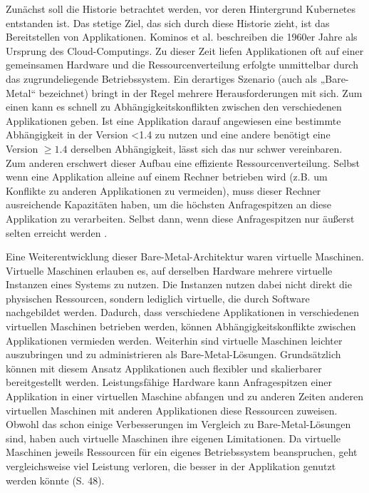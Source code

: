 \documentclass[11pt,a4paper]{article}
\begin{document}
Zunächst soll die Historie betrachtet werden, vor deren Hintergrund Kubernetes entstanden ist.
Das stetige Ziel, das sich durch diese Historie zieht, ist das Bereitstellen von Applikationen.
Kominos et al. \cite{7899247} beschreiben die 1960er Jahre als Ursprung des Cloud-Computings.
Zu dieser Zeit liefen Applikationen oft auf einer gemeinsamen Hardware und die Ressourcenverteilung erfolgte unmittelbar durch das zugrundeliegende Betriebssystem.
Ein derartiges Szenario (auch als „Bare-Metal“ bezeichnet) bringt in der Regel mehrere Herausforderungen mit sich.
Zum einen kann es schnell zu Abhängigkeitskonflikten zwischen den verschiedenen Applikationen geben.
Ist eine Applikation darauf angewiesen eine bestimmte Abhängigkeit in der Version <1.4 zu nutzen und eine andere
benötigt eine Version \(\geq 1.4\) derselben Abhängigkeit, lässt sich das nur schwer vereinbaren.
Zum anderen erschwert dieser Aufbau eine effiziente Ressourcenverteilung. Selbst wenn eine Applikation alleine auf einem Rechner betrieben wird (z.B. um Konflikte zu anderen
Applikationen zu vermeiden), muss dieser Rechner ausreichende Kapazitäten haben, um die höchsten Anfragespitzen an diese Applikation zu verarbeiten.
Selbst dann, wenn diese Anfragespitzen nur äußerst selten erreicht werden \cite{Pagani_2019}. %

Eine Weiterentwicklung dieser Bare-Metal-Architektur waren virtuelle Maschinen.
Virtuelle Maschinen erlauben es, auf derselben Hardware mehrere virtuelle Instanzen eines
Systems zu nutzen. Die Instanzen nutzen dabei nicht direkt die physischen Ressourcen, sondern lediglich virtuelle,
die durch Software nachgebildet werden.
Dadurch, dass verschiedene Applikationen in verschiedenen virtuellen Maschinen betrieben werden, können Abhängigkeitskonflikte zwischen Applikationen
vermieden werden. Weiterhin sind virtuelle Maschinen leichter auszubringen und zu administrieren als Bare-Metal-Lösungen.
Grundsätzlich können mit diesem Ansatz Applikationen auch flexibler und skalierbarer bereitgestellt werden.
Leistungsfähige Hardware kann Anfragespitzen einer Applikation in einer virtuellen Maschine abfangen und
zu anderen Zeiten anderen virtuellen Maschinen mit anderen
Applikationen diese Ressourcen zuweisen.
Obwohl das schon einige Verbesserungen im Vergleich zu Bare-Metal-Lösungen sind, haben auch virtuelle Maschinen ihre eigenen Limitationen.
Da virtuelle Maschinen jeweils Ressourcen für ein eigenes Betriebssystem beanspruchen, geht vergleichsweise viel Leistung verloren,
die besser in der Applikation genutzt werden könnte \cite{kofler2021docker} (S. 48).
\end{document}

